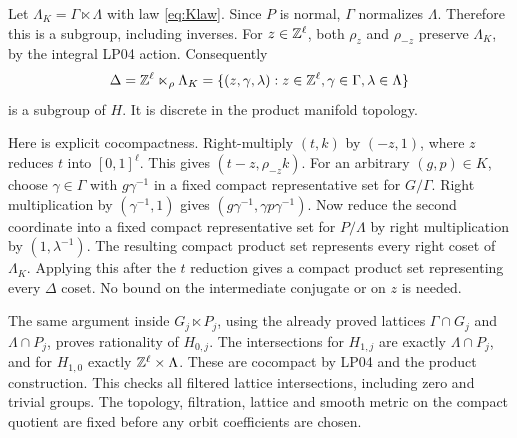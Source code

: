 \documentclass[11pt]{article}
\begin{document}
Let $\Lambda_K=\Gamma\ltimes\Lambda$ with law \eqref{eq:Klaw}.
Since $P$ is normal, $\Gamma$ normalizes $\Lambda$. Therefore this is
a subgroup, including inverses. For $z\in\mathbb Z^\ell$, both $\rho_z$
and $\rho_{-z}$ preserve $\Lambda_K$, by the integral LP04 action.
Consequently
\[
 \Delta=\mathbb Z^\ell\ltimes_\rho\Lambda_K
       =\{(z,\gamma,\lambda):z\in\mathbb Z^\ell,
                   \gamma\in\Gamma,\lambda\in\Lambda\}
\]
is a subgroup of $H$. It is discrete in the product manifold topology.

Here is explicit cocompactness. Right-multiply $(t,k)$ by $(-z,1)$,
where $z$ reduces $t$ into $[0,1]^\ell$. This gives
$(t-z,\rho_{-z}k)$. For an arbitrary $(g,p)\in K$, choose
$\gamma\in\Gamma$ with $g\gamma^{-1}$ in a fixed compact
representative set for $G/\Gamma$. Right multiplication by
$(\gamma^{-1},1)$ gives $(g\gamma^{-1},\gamma p\gamma^{-1})$.
Now reduce the second coordinate into a fixed compact representative
set for $P/\Lambda$ by right multiplication by $(1,\lambda^{-1})$.
The resulting compact product set represents every right coset of
$\Lambda_K$. Applying this after the $t$ reduction gives a compact
product set representing every $\Delta$ coset. No bound on the
intermediate conjugate or on $z$ is needed.

The same argument inside $G_j\ltimes P_j$, using the already proved
lattices $\Gamma\cap G_j$ and $\Lambda\cap P_j$, proves rationality
of $H_{0,j}$. The intersections for $H_{1,j}$ are exactly
$\Lambda\cap P_j$, and for $H_{1,0}$ exactly $\mathbb Z^\ell\times\Lambda$.
These are cocompact by LP04 and the product construction. This checks
all filtered lattice intersections, including zero and trivial groups.
The topology, filtration, lattice and smooth metric on the compact
quotient are fixed before any orbit coefficients are chosen.
\end{document}

